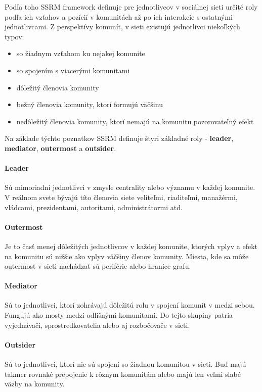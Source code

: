 \documentclass[slovak,master,public,dept460,male,cpdeclaration,oneside]{diploma}
\begin{document}
Podľa toho SSRM framework definuje pre jednotlivcov v sociálnej sieti určité roly podľa ich vzťahov a pozícií v komunitách až po ich interakcie s ostatnými jednotlivcami. Z perspektívy komunít, v sieti existujú jednotlivci niekoľkých typov:

\begin{itemize}
\item so žiadnym vzťahom ku nejakej komunite
\item so spojením s viacerými komunitami
\item dôležitý členovia komunity
\item bežný členovia komunity, ktorí formujú väčšinu
\item nedôležitý členovia komunity, ktorí nemajú na komunitu pozorovateľný efekt
\end{itemize} 


Na základe týchto poznatkov SSRM definuje štyri základné roly - \textbf{leader}, \textbf{mediator}, \textbf{outermost} a \textbf{outsider}.

\paragraph{Leader}
\hfill \break
Sú mimoriadni jednotlivci v zmysle centrality alebo významu v každej komunite. V reálnom svete bývajú títo členovia siete veliteľmi, riaditeľmi, manažérmi,  vládcami, prezidentami, autoritami, administrátormi atd.

\paragraph{Outermost}
\hfill \break
Je to časť menej dôležitých jednotlivcov v každej komunite, ktorých vplyv a efekt na komunitu sú nižšie ako vplyv väčšiny členov komunity. Miesta, kde sa môže outermost v sieti nachádzať sú periférie alebo hranice grafu.

\paragraph{Mediator}
\hfill \break
Sú to jednotlivci, ktorí zohrávajú dôležitú rolu v spojení komunít v medzi sebou. Fungujú ako mosty medzi odlišnými komunitami. Do tejto skupiny patria vyjednávači, sprostredkovatelia alebo aj rozbočovače v sieti. 

\paragraph{Outsider}
\hfill \break
Sú to jednotlivci, ktorí nie sú spojení so žiadnou komunitou v sieti. Buď majú takmer rovnaké prepojenie k rôznym komunitám alebo majú len veľmi slabé väzby na komunity.
\end{document}

